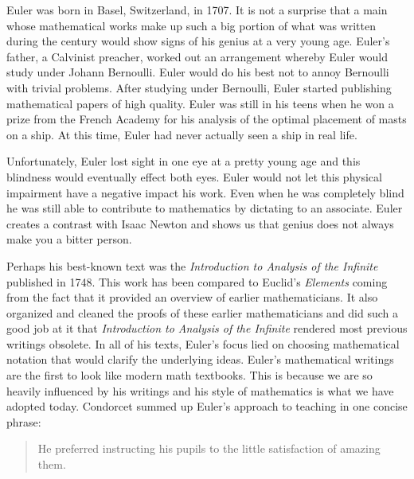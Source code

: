 \documentclass[12pt]{article}
\begin{document}
\begin{doublespace}
%
Euler was born in Basel, Switzerland, in 1707. It is not a surprise that a main whose mathematical works make up such a big portion of what was written during the century would show signs of his genius at a very young age. Euler's father, a Calvinist preacher, worked out an arrangement whereby Euler would study under Johann Bernoulli. Euler would do his best not to annoy Bernoulli with trivial problems. After studying under Bernoulli, Euler started publishing mathematical papers of high quality. Euler was still in his teens when he won a prize from the French Academy for his analysis of the optimal placement of masts on a ship. At this time, Euler had never actually seen a ship in real life.

Unfortunately, Euler lost sight in one eye at a pretty young age and this blindness would eventually effect both eyes. Euler would not let this physical impairment have a negative impact his work. Even when he was completely blind he was still able to contribute to mathematics by dictating to an associate. Euler creates a contrast with Isaac Newton and shows us that genius does not always make you a bitter person. 

Perhaps his best-known text was the \emph{Introduction to Analysis of the Infinite} published in 1748. This work has been compared to Euclid's \emph{Elements} coming from the fact that it provided an overview of earlier mathematicians. It also organized and cleaned the proofs of these earlier mathematicians and did such a good job at it that \emph{Introduction to Analysis of the Infinite} rendered most previous writings obsolete.
%
In all of his texts, Euler's focus lied on choosing mathematical notation that would clarify the underlying ideas. Euler's mathematical writings are the first to look like modern math textbooks. This is because we are so heavily influenced by his writings and his style of mathematics is what we have adopted today.
%
Condorcet summed up Euler's approach to teaching in one concise phrase:
%
\end{doublespace}
\vspace{-5mm}
\begin{quote}
He preferred instructing his pupils to the little satisfaction of    
amazing them.
\end{quote}
\vspace{-5mm}
\end{document}
